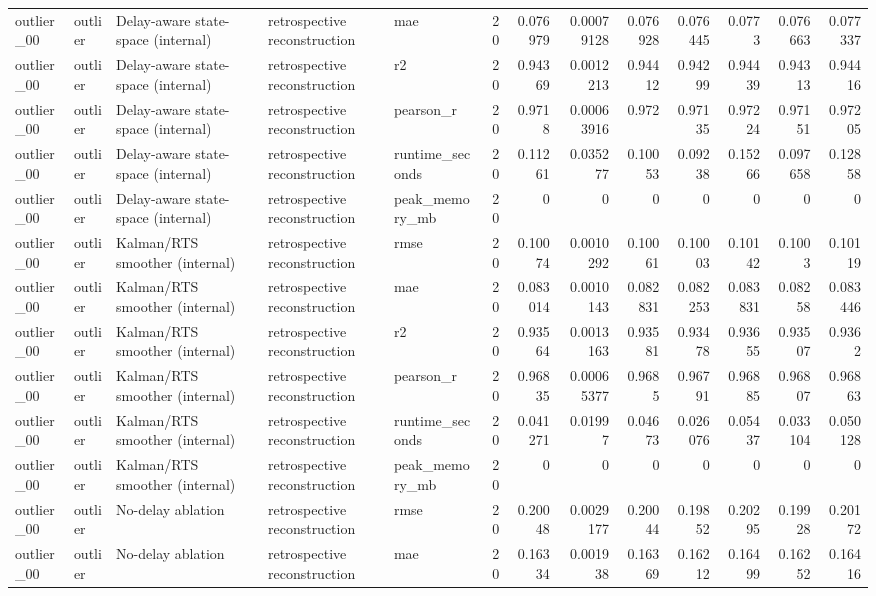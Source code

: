 \begin{table}[!htbp]
{{\begin{tabular}{lllllrrrrrrrr}
outlier_00 & outlier & Delay-aware state-space (internal) & retrospective reconstruction & mae & 20 & 0.076979 & 0.00079128 & 0.076928 & 0.076445 & 0.0773 & 0.076663 & 0.077337 \\
outlier_00 & outlier & Delay-aware state-space (internal) & retrospective reconstruction & r2 & 20 & 0.94369 & 0.0012213 & 0.94412 & 0.94299 & 0.94439 & 0.94313 & 0.94416 \\
outlier_00 & outlier & Delay-aware state-space (internal) & retrospective reconstruction & pearson_r & 20 & 0.9718 & 0.00063916 & 0.972 & 0.97135 & 0.97224 & 0.97151 & 0.97205 \\
outlier_00 & outlier & Delay-aware state-space (internal) & retrospective reconstruction & runtime_seconds & 20 & 0.11261 & 0.035277 & 0.10053 & 0.09238 & 0.15266 & 0.097658 & 0.12858 \\
outlier_00 & outlier & Delay-aware state-space (internal) & retrospective reconstruction & peak_memory_mb & 20 & 0 & 0 & 0 & 0 & 0 & 0 & 0 \\
outlier_00 & outlier & Kalman/RTS smoother (internal) & retrospective reconstruction & rmse & 20 & 0.10074 & 0.0010292 & 0.10061 & 0.10003 & 0.10142 & 0.1003 & 0.10119 \\
outlier_00 & outlier & Kalman/RTS smoother (internal) & retrospective reconstruction & mae & 20 & 0.083014 & 0.0010143 & 0.082831 & 0.082253 & 0.083831 & 0.08258 & 0.083446 \\
outlier_00 & outlier & Kalman/RTS smoother (internal) & retrospective reconstruction & r2 & 20 & 0.93564 & 0.0013163 & 0.93581 & 0.93478 & 0.93655 & 0.93507 & 0.9362 \\
outlier_00 & outlier & Kalman/RTS smoother (internal) & retrospective reconstruction & pearson_r & 20 & 0.96835 & 0.00065377 & 0.9685 & 0.96791 & 0.96885 & 0.96807 & 0.96863 \\
outlier_00 & outlier & Kalman/RTS smoother (internal) & retrospective reconstruction & runtime_seconds & 20 & 0.041271 & 0.01997 & 0.04673 & 0.026076 & 0.05437 & 0.033104 & 0.050128 \\
outlier_00 & outlier & Kalman/RTS smoother (internal) & retrospective reconstruction & peak_memory_mb & 20 & 0 & 0 & 0 & 0 & 0 & 0 & 0 \\
outlier_00 & outlier & No-delay ablation & retrospective reconstruction & rmse & 20 & 0.20048 & 0.0029177 & 0.20044 & 0.19852 & 0.20295 & 0.19928 & 0.20172 \\
outlier_00 & outlier & No-delay ablation & retrospective reconstruction & mae & 20 & 0.16334 & 0.001938 & 0.16369 & 0.16212 & 0.16499 & 0.16252 & 0.16416 \\

\end{tabular}}}
\end{table}
